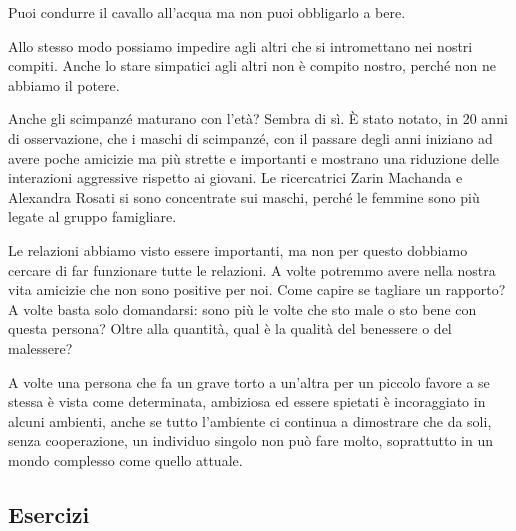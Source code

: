 \documentclass[12pt]{book} %
\begin{document}
Puoi condurre il cavallo all'acqua ma non puoi obbligarlo a bere.

Allo stesso modo possiamo impedire agli altri che si intromettano nei nostri compiti. Anche lo stare simpatici agli
altri non è compito nostro, perché non ne abbiamo il potere.

\begin{mdframed}[linewidth=1pt]
Anche gli scimpanzé maturano con l'età? Sembra di sì. È stato notato, in 20 anni di
osservazione, che i maschi di scimpanzé, con il passare degli anni iniziano ad avere poche amicizie ma più strette e
importanti e mostrano una riduzione delle interazioni aggressive rispetto ai giovani. Le ricercatrici Zarin Machanda e Alexandra Rosati si sono concentrate sui maschi, perché le femmine sono più legate al gruppo famigliare. 
\end{mdframed}

Le relazioni abbiamo visto essere importanti, ma non per questo dobbiamo cercare di far funzionare tutte le relazioni. A
volte potremmo avere nella nostra vita amicizie che non sono positive per noi.
Come capire se tagliare un rapporto? A volte basta solo domandarsi: sono più le volte che sto male o sto bene con questa persona? Oltre alla quantità, qual è la qualità del benessere o del malessere?

A volte una persona che fa un grave torto a un'altra per un piccolo favore a se stessa è vista come
determinata, ambiziosa ed essere spietati è incoraggiato in alcuni ambienti, anche se tutto
l'ambiente ci continua a dimostrare che da soli, senza cooperazione, un individuo singolo non può
fare molto, soprattutto in un mondo complesso come quello attuale.

\subsection{Esercizi}
\end{document}
